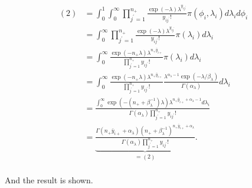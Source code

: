  \begin{align*}
 (2) &= \int_0^1\int_0^\infty\prod_{j^\prime=1}^{n_+}\frac{\exp{(-\lambda)}\lambda^{y_{ij^\prime}} }{y_{ij^\prime}!}\pi(\phi_i,\lambda_i )d\lambda_id\phi_i \\
 &= \int_0^\infty \prod_{j^\prime=1}^{n_+}\frac{\exp{(-\lambda)}\lambda^{y_{ij^\prime}} }{y_{ij^\prime}!}\pi(\lambda_i )d\lambda_i \\
 &= \int_0^\infty\frac{\exp{(-n_+\lambda)}\lambda^{n_+\bar{y}_{i+}} }{\prod_{j^\prime=1}^{n_+}y_{ij^\prime}!}\pi(\lambda_i )d\lambda_i \\
 &= \int_0^\infty\frac{\exp{(-n_+\lambda)}\lambda^{n_+\bar{y}_{i+}} }{\prod_{j^\prime=1}^{n_+}y_{ij^\prime}!}\frac{\lambda^{\alpha_{\lambda}-1}\exp{(-\lambda/\beta_{\lambda})}}{\Gamma(\alpha_{\lambda})}d\lambda_i \\
 &= \frac{\int_0^\infty\exp{(-(n_+ +\beta_{\lambda}^{-1})\lambda)}\lambda^{n_+\bar{y}_{i+} +\alpha_{\lambda}-1} d\lambda_i}{\Gamma(\alpha_{\lambda})\prod_{j^\prime=1}^{n_+}y_{ij^\prime}!} \\
 &= \underbrace{\frac{\Gamma(n_+\bar{y}_{i+}+\alpha_{\lambda})(n_+ +\beta_{\lambda}^{-1})^{n_+\bar{y}_{i+}+\alpha_{\lambda}}}{\Gamma(\alpha_{\lambda})\prod_{j^\prime=1}^{n_+}y_{ij^\prime}!}}_{=(2)}. \\
 \end{align*}
 
 And the result is shown. 







